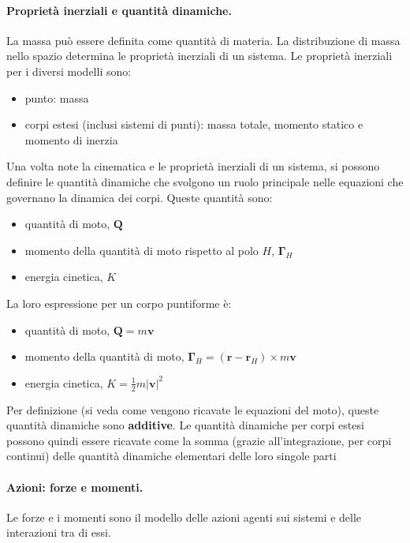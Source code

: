 \paragraph{Proprietà inerziali e quantità dinamiche.} La massa può essere definita come quantità di materia. La distribuzione di massa nello spazio determina le proprietà inerziali di un sistema.
Le proprietà inerziali per i diversi modelli sono:
\begin{itemize}
    \item punto: massa
    \item corpi estesi (inclusi sistemi di punti): massa totale, momento statico e momento di inerzia
\end{itemize}
Una volta note la cinematica e le proprietà inerziali di un sistema, si possono definire le quantità dinamiche che svolgono un ruolo principale nelle equazioni che governano la dinamica dei corpi. Queste quantità sono:
\begin{itemize}
    \item quantità di moto, $\mathbf{Q}$
    \item momento della quantità di moto rispetto al polo $H$, $\mathbf{\Gamma}_H$
    \item energia cinetica, $K$
\end{itemize}
La loro espressione per un corpo puntiforme è:
\begin{itemize}
    \item quantità di moto, $\mathbf{Q} = m \mathbf{v}$
    \item momento della quantità di moto, $\mathbf{\Gamma}_H = ( \mathbf{r} - \mathbf{r}_H ) \times m \mathbf{v}$
    \item energia cinetica, $K = \frac{1}{2} m |\mathbf{v}|^2$
\end{itemize}
Per definizione (si veda come vengono ricavate le equazioni del moto), queste quantità dinamiche sono \textbf{additive}. Le quantità dinamiche per corpi estesi possono quindi essere ricavate come la somma (grazie all'integrazione, per corpi continui) delle quantità dinamiche elementari delle loro singole parti

\vspace{8pt}
\paragraph{Azioni: forze e momenti.} Le forze e i momenti sono il modello delle azioni agenti sui sistemi e delle interazioni tra di essi.

\vspace{8pt}
